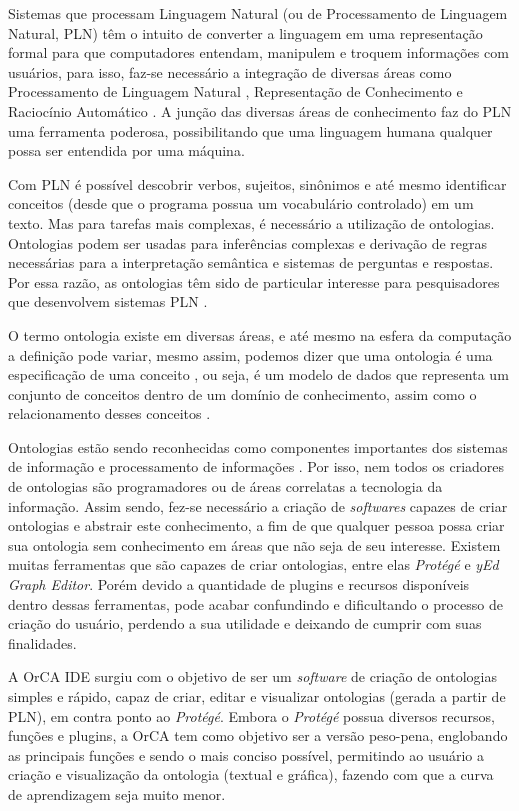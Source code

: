 \documentclass{bcc}
\begin{document}
Sistemas que processam Linguagem Natural (ou de Processamento de Linguagem Natural, PLN) têm o intuito de converter a linguagem em uma representação formal para que computadores entendam, manipulem e troquem informações com usuários, para isso, faz-se necessário a integração de diversas áreas como Processamento de Linguagem Natural \cite{brill1995}, Representação de Conhecimento \cite{levesque1986} e Raciocínio Automático \cite{wos1984}. A junção das diversas áreas de conhecimento faz do PLN uma ferramenta poderosa, possibilitando que uma linguagem humana qualquer possa ser entendida por uma máquina.

Com PLN é possível descobrir verbos, sujeitos, sinônimos e até mesmo identificar conceitos (desde que o programa possua um vocabulário controlado) em um texto. Mas para tarefas mais complexas, é necessário a utilização de ontologias. Ontologias podem ser usadas para inferências complexas e derivação de regras necessárias para a interpretação semântica e sistemas de perguntas e respostas. Por essa razão, as ontologias têm sido de particular interesse para pesquisadores que desenvolvem sistemas PLN \cite{liu2011}.

O termo ontologia existe em diversas áreas, e até mesmo na esfera da computação a definição pode variar, mesmo assim, podemos dizer que uma ontologia é uma especificação de uma conceito \cite{guarino2009}, ou seja, é um modelo de dados que representa um conjunto de conceitos dentro de um domínio de conhecimento, assim como o relacionamento desses conceitos \cite{estival2004}.

Ontologias estão sendo reconhecidas como componentes importantes dos sistemas de informação e processamento de informações \cite{estival2004}. Por isso, nem todos os criadores de ontologias são programadores ou de áreas correlatas a tecnologia da informação. Assim sendo, fez-se necessário a criação de \textit{softwares} capazes de criar ontologias e abstrair este conhecimento, a fim de que qualquer pessoa possa criar sua ontologia sem conhecimento em áreas que não seja de seu interesse. Existem muitas ferramentas que são capazes de criar ontologias, entre elas \textit{Protégé} \cite{noy2001} e \textit{yEd Graph Editor}. Porém devido a quantidade de plugins e recursos disponíveis dentro dessas ferramentas, pode acabar confundindo e dificultando o processo de criação do usuário, perdendo a sua utilidade e deixando de cumprir com suas finalidades.

A OrCA IDE surgiu com o objetivo de ser um \textit{software} de criação de ontologias simples e rápido, capaz de criar, editar e visualizar ontologias (gerada a partir de PLN), em contra ponto ao \textit{Protégé}. Embora o \textit{Protégé} possua diversos recursos, funções e plugins, a OrCA tem como objetivo ser a versão peso-pena, englobando as principais funções e sendo o mais conciso possível, permitindo ao usuário a criação e visualização da ontologia (textual e gráfica), fazendo com que a curva de aprendizagem seja muito menor. 
\end{document}
